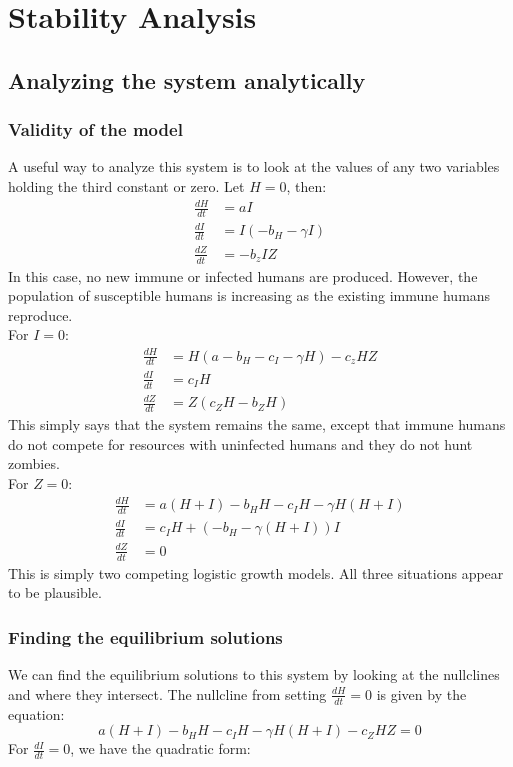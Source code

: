 \documentclass[
	12pt
]{article}
\begin{document}
\section{Stability Analysis}
	\subsection{Analyzing the system analytically}
		\subsubsection{Validity of the model}
			A useful way to analyze this system is to look at the values of any two variables holding the third constant or zero.
			Let $H= 0$, then:
			\begin{align*}
				\frac{dH}{dt} &=aI\\
				\frac{dI}{dt} &= I(-b_H-\gamma I)\\
				\frac{dZ}{dt} &= -b_z IZ
			\end{align*}
			In this case, no new immune or infected humans are produced. However, the population of susceptible humans is increasing as the existing immune humans reproduce. \\
			For $I=0$:
			\begin{align*}
				\frac{dH}{dt} &= H(a-b_H-c_I-\gamma H)-c_z HZ\\
				\frac{dI}{dt} &= c_IH\\
				\frac{dZ}{dt} &= Z(c_ZH-b_ZH)
			\end{align*}	
			This simply says that the system remains the same, except that immune humans do not compete for resources with uninfected humans and they do not hunt zombies.\\
			For $Z=0$:
			\begin{align*}
				\frac{dH}{dt} &= a(H+I)-b_HH-c_IH-\gamma H(H+I)\\
				\frac{dI}{dt} &= c_IH+(-b_H-\gamma(H+I))I \\
				\frac{dZ}{dt} &= 0
			\end{align*}
			This is simply two competing logistic growth models. All three situations appear to be plausible.
		\subsubsection{Finding the equilibrium solutions}
We can find the equilibrium solutions to this system by looking at the nullclines and where they intersect. The nullcline from setting $\frac{dH}{dt}=0$ is given by the equation:
\begin{equation}
a(H+I)-b_HH-c_IH-\gamma H(H+I)-c_ZHZ=0
\end{equation}
For $\frac{dI}{dt}=0$, we have the quadratic form:
\end{document}
